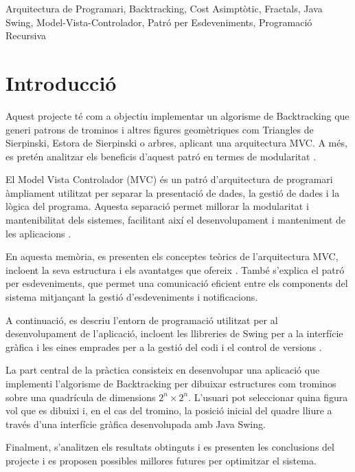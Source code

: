\documentclass{ieeetj}
\begin{document}
\begin{IEEEkeywords} 
Arquitectura de Programari, Backtracking, Cost Asimptòtic, Fractals, Java Swing, Model-Vista-Controlador, Patró per Esdeveniments, Programació Recursiva 
\end{IEEEkeywords}

\maketitle

\section{Introducció} 
Aquest projecte té com a objectiu implementar un algorisme de Backtracking que generi patrons de trominos i altres figures geomètriques com Triangles de Sierpinski, Estora de Sierpinski o arbres, aplicant una arquitectura MVC. A més, es pretén analitzar els beneficis d'aquest patró en termes de modularitat \cite{mvcPattern}.

El Model Vista Controlador (MVC) és un patró d'arquitectura de programari àmpliament utilitzat per separar la presentació de dades, la gestió de dades i la lògica del programa. Aquesta separació permet millorar la modularitat i mantenibilitat dels sistemes, facilitant així el desenvolupament i manteniment de les aplicacions \cite{MVC_Theory}.

En aquesta memòria, es presenten els conceptes teòrics de l'arquitectura MVC, incloent la seva estructura i els avantatges que ofereix \cite{mvcBenefits}. També s'explica el patró per esdeveniments, que permet una comunicació eficient entre els components del sistema mitjançant la gestió d'esdeveniments i notificacions.

A continuació, es descriu l'entorn de programació utilitzat per al desenvolupament de l'aplicació, incloent les llibreries de Swing per a la interfície gràfica i les eines emprades per a la gestió del codi i el control de versions \cite{SwingLibrary}.

La part central de la pràctica consisteix en desenvolupar una aplicació que implementi l'algorisme de Backtracking per dibuixar estructures com trominos sobre una quadrícula de dimensions \( 2^n \times 2^n \). L'usuari pot seleccionar quina figura vol que es dibuixi i, en el cas del tromino, la posició inicial del quadre lliure a través d'una interfície gràfica desenvolupada amb Java Swing.

Finalment, s'analitzen els resultats obtinguts i es presenten les conclusions del projecte i es proposen possibles millores futures per optimitzar el sistema.
\end{document}
